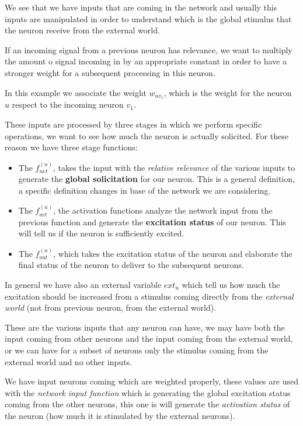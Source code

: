 \documentclass{article}
\begin{document}
We see that we have inputs that are coming in the network and usually this inputs are
manipulated in order to understand which is the global stimulus that the neuron
receive from the external world.

If an incoming signal from a previous neuron has relevance, we want to multiply the
amount o signal incoming in by an appropriate constant in order to have a stronger weight
for a subsequent processing in this neuron.

In this example we associate the weight $w_{uv_1}$, which is the weight for the neuron
$u$ respect to the incoming neuron $v_1$.

These inputs are processed by three stages in which we perform specific operations, we want
to see how much the neuron is actually solicited. For these reason we have three
stage functions:

\begin{itemize}
    \item The $f_{net}^{(u)}$, takes the input with the \textit{relative relevance} of the
          various inputs to generate the \textbf{global solicitation} for our neuron. This is a general
          definition, a specific definition changes in base of the network we are considering.

    \item The $f_{act}^{(u)}$, the activation functions analyze the network input from the
          previous function and generate the \textbf{excitation status} of our neuron. This will tell
          us if the neuron is sufficiently excited.

    \item The $f_{out}^{(u)}$, which takes the excitation status of the neuron and elaborate
          the final status of the neuron to deliver to the subsequent neurons.
\end{itemize}

In general we have also an external variable $ext_u$ which tell us how much the excitation
should be increased from a stimulus coming directly from the \textit{external world}
(not from previous neuron, from the external world).

These are the various inputs that any neuron can have, we may have both the input coming
from other neurons and the input coming from the external world, or we can have for a subset
of neurons only the stimulus coming from the external world and no other inputs.

We have input neurons coming which are weighted properly, these values are used
with the \textit{network input function} which is generating the global excitation status
coming from the other neurons, this one is will generate the \textit{activation status} of the neuron (how much it is
stimulated by the external neurons).
\end{document}
